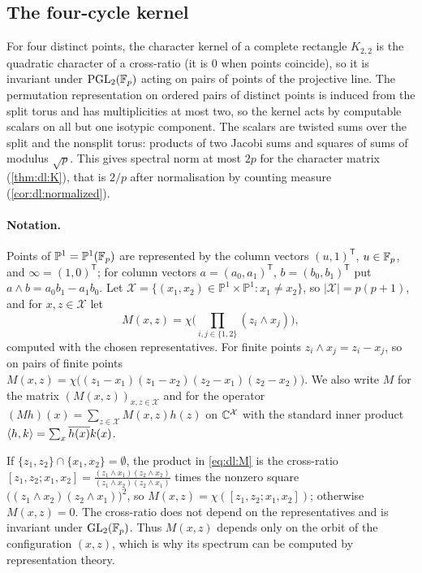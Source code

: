 \subsection{The four-cycle kernel}\label{subsec:dl:K}

For four distinct points, the character kernel of a complete
rectangle $K_{2,2}$ is the quadratic character of a cross-ratio
(it is $0$ when points coincide), so it is invariant under
$\mathrm{PGL}_2(\mathbb F_p)$
acting on pairs of points of the projective line. The permutation
representation on ordered pairs of distinct points is induced from the split
torus and has multiplicities at most two, so the kernel acts by computable
scalars on all but one isotypic component. The scalars are twisted sums over
the split and the nonsplit torus: products of two Jacobi sums and squares of
sums of modulus $\sqrt p$. This gives spectral norm at most $2p$
for the character matrix (\cref{thm:dl:K}), that is $2/p$ after
normalisation by counting measure
(\cref{cor:dl:normalized}).

\paragraph{Notation.} Points of $\mathbb P^1=\mathbb P^1(\mathbb F_p)$ are represented
by the column vectors $(u,1)^{\mathsf T}$, $u\in\mathbb F_p$, and
$\infty=(1,0)^{\mathsf T}$; for column vectors $a=(a_0,a_1)^{\mathsf T}$,
$b=(b_0,b_1)^{\mathsf T}$ put $a\wedge b=a_0b_1-a_1b_0$. Let
$\mathcal X=\{(x_1,x_2)\in\mathbb P^1\times\mathbb P^1:x_1\ne x_2\}$, so
$|\mathcal X|=p(p+1)$, and for $x,z\in\mathcal X$ let
\begin{equation}\label{eq:dl:M}
  M(x,z)=\chi\Big(\prod_{i,j\in\{1,2\}}(z_i\wedge x_j)\Big),
\end{equation}
computed with the chosen representatives. For finite points
$z_i\wedge x_j=z_i-x_j$, so on pairs of finite points
$M(x,z)=\chi\big((z_1-x_1)(z_1-x_2)(z_2-x_1)(z_2-x_2)\big)$. We also write $M$
for the matrix $(M(x,z))_{x,z\in\mathcal X}$ and for the operator
$(Mh)(x)=\sum_{z\in\mathcal X}M(x,z)h(z)$ on $\mathbb C^{\mathcal X}$ with the
standard inner product $\left\langle h,k\right\rangle=\sum_x\overline{h(x)}k(x)$.

If $\{z_1,z_2\}\cap\{x_1,x_2\}=\emptyset$, the product in \eqref{eq:dl:M} is
the cross-ratio
$[z_1,z_2;x_1,x_2]=\frac{(z_1\wedge x_1)(z_2\wedge x_2)}{(z_1\wedge x_2)(z_2\wedge x_1)}$
times the nonzero square $\big((z_1\wedge x_2)(z_2\wedge x_1)\big)^2$, so
$M(x,z)=\chi([z_1,z_2;x_1,x_2])$; otherwise $M(x,z)=0$. The cross-ratio does
not depend on the representatives and is invariant under
$\mathrm{GL}_2(\mathbb F_p)$. Thus $M(x,z)$ depends only on the orbit of the
configuration $(x,z)$, which is why its spectrum can be computed by
representation theory.

